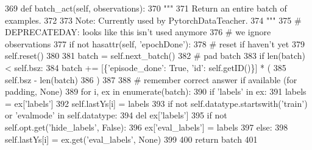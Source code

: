 \begin{DoxyCode}
369     \textcolor{keyword}{def }batch\_act(self, observations):
370         \textcolor{stringliteral}{"""}
371 \textcolor{stringliteral}{        Return an entire batch of examples.}
372 \textcolor{stringliteral}{}
373 \textcolor{stringliteral}{        Note: Currently used by PytorchDataTeacher.}
374 \textcolor{stringliteral}{        """}
375         \textcolor{comment}{# DEPRECATEDAY: looks like this isn't used anymore}
376         \textcolor{comment}{# we ignore observations}
377         \textcolor{keywordflow}{if} \textcolor{keywordflow}{not} hasattr(self, \textcolor{stringliteral}{'epochDone'}):
378             \textcolor{comment}{# reset if haven't yet}
379             self.reset()
380 
381         batch = self.next\_batch()
382         \textcolor{comment}{# pad batch}
383         \textcolor{keywordflow}{if} len(batch) < self.bsz:
384             batch += [\{\textcolor{stringliteral}{'episode\_done'}: \textcolor{keyword}{True}, \textcolor{stringliteral}{'id'}: self.getID()\}] * (
385                 self.bsz - len(batch)
386             )
387 
388         \textcolor{comment}{# remember correct answer if available (for padding, None)}
389         \textcolor{keywordflow}{for} i, ex \textcolor{keywordflow}{in} enumerate(batch):
390             \textcolor{keywordflow}{if} \textcolor{stringliteral}{'labels'} \textcolor{keywordflow}{in} ex:
391                 labels = ex[\textcolor{stringliteral}{'labels'}]
392                 self.lastYs[i] = labels
393                 \textcolor{keywordflow}{if} \textcolor{keywordflow}{not} self.datatype.startswith(\textcolor{stringliteral}{'train'}) \textcolor{keywordflow}{or} \textcolor{stringliteral}{'evalmode'} \textcolor{keywordflow}{in} self.datatype:
394                     del ex[\textcolor{stringliteral}{'labels'}]
395                     \textcolor{keywordflow}{if} \textcolor{keywordflow}{not} self.opt.get(\textcolor{stringliteral}{'hide\_labels'}, \textcolor{keyword}{False}):
396                         ex[\textcolor{stringliteral}{'eval\_labels'}] = labels
397             \textcolor{keywordflow}{else}:
398                 self.lastYs[i] = ex.get(\textcolor{stringliteral}{'eval\_labels'}, \textcolor{keywordtype}{None})
399 
400         \textcolor{keywordflow}{return} batch
401 
\end{DoxyCode}
\mbox{\label{classparlai_1_1core_1_1teachers_1_1FixedDialogTeacher_a7c4cbfbe5cf6e9dbdf8c00d140ef4e7e}} 
